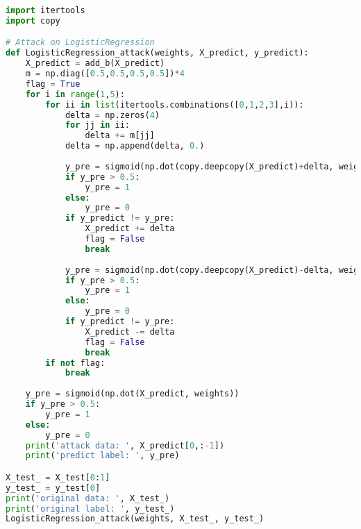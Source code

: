 \begin{lstlisting}[language=Python]
import itertools
import copy 

# Attack on LogisticRegression
def LogisticRegression_attack(weights, X_predict, y_predict): 
    X_predict = add_b(X_predict)
    m = np.diag([0.5,0.5,0.5,0.5])*4
    flag = True
    for i in range(1,5):
        for ii in list(itertools.combinations([0,1,2,3],i)):
            delta = np.zeros(4)
            for jj in ii:
                delta += m[jj]
            delta = np.append(delta, 0.)
            
            y_pre = sigmoid(np.dot(copy.deepcopy(X_predict)+delta, weights))       
            if y_pre > 0.5:
                y_pre = 1
            else:
                y_pre = 0
            if y_predict != y_pre:
                X_predict += delta
                flag = False
                break
                
            y_pre = sigmoid(np.dot(copy.deepcopy(X_predict)-delta, weights))       
            if y_pre > 0.5:
                y_pre = 1
            else:
                y_pre = 0
            if y_predict != y_pre:
                X_predict -= delta
                flag = False
                break
        if not flag:
            break
    
    y_pre = sigmoid(np.dot(X_predict, weights))       
    if y_pre > 0.5:
        y_pre = 1
    else:
        y_pre = 0
    print('attack data: ', X_predict[0,:-1])
    print('predict label: ', y_pre)

X_test_ = X_test[0:1]
y_test_ = y_test[0]
print('original data: ', X_test_)
print('original label: ', y_test_)
LogisticRegression_attack(weights, X_test_, y_test_)
\end{lstlisting}
